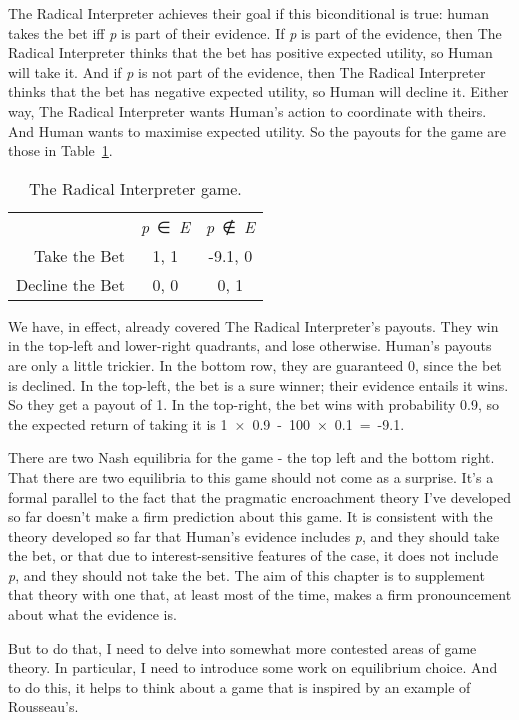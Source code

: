 \documentclass[
  12pt,
  letterpaper,
]{scrbook}
\begin{document}
The Radical Interpreter achieves their goal if this biconditional is
true: human takes the bet iff \emph{p} is part of their evidence. If
\emph{p} is part of the evidence, then The Radical Interpreter thinks
that the bet has positive expected utility, so Human will take it. And
if \emph{p} is not part of the evidence, then The Radical Interpreter
thinks that the bet has negative expected utility, so Human will decline
it. Either way, The Radical Interpreter wants Human's action to
coordinate with theirs. And Human wants to maximise expected utility. So
the payouts for the game are those in
Table~\ref{tbl-radical-interpreter}.

\begin{longtable}[]{@{}rcc@{}}
\caption{The Radical Interpreter
game.}\label{tbl-radical-interpreter}\tabularnewline
\toprule\noalign{}
\endfirsthead
\endhead
\bottomrule\noalign{}
\endlastfoot
& \emph{p}~∈~\emph{E} & \emph{p}~∉~\emph{E} \\
Take the Bet & 1, 1 & -9.1, 0 \\
Decline the Bet & 0, 0 & 0, 1 \\
\end{longtable}

We have, in effect, already covered The Radical Interpreter's payouts.
They win in the top-left and lower-right quadrants, and lose otherwise.
Human's payouts are only a little trickier. In the bottom row, they are
guaranteed 0, since the bet is declined. In the top-left, the bet is a
sure winner; their evidence entails it wins. So they get a payout of 1.
In the top-right, the bet wins with probability 0.9, so the expected
return of taking it is 1~×~0.9~-~100~×~0.1~=~-9.1.

There are two Nash equilibria for the game - the top left and the bottom
right. That there are two equilibria to this game should not come as a
surprise. It's a formal parallel to the fact that the pragmatic
encroachment theory I've developed so far doesn't make a firm prediction
about this game. It is consistent with the theory developed so far that
Human's evidence includes \emph{p}, and they should take the bet, or
that due to interest-sensitive features of the case, it does not include
\emph{p}, and they should not take the bet. The aim of this chapter is
to supplement that theory with one that, at least most of the time,
makes a firm pronouncement about what the evidence is.

But to do that, I need to delve into somewhat more contested areas of
game theory. In particular, I need to introduce some work on equilibrium
choice. And to do this, it helps to think about a game that is inspired
by an example of Rousseau's.
\end{document}
